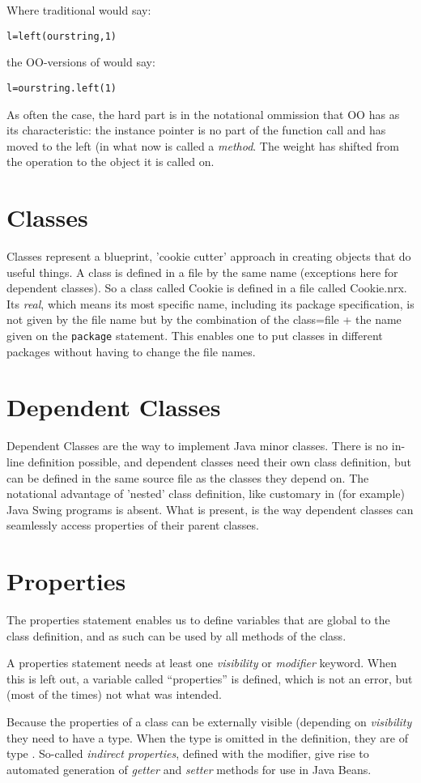 Where traditional \Rexx{} would say:
\begin{alltt}
l=left(ourstring,1)
\end{alltt}
the OO-versions of \Rexx{} would say:
\begin{alltt}
l=ourstring.left(1)
\end{alltt}
As often the case, the hard part is in the notational ommission that
OO has as its characteristic: the instance pointer is no part of the
function call and has moved to the left (in what now is called a
\emph{method}. The weight has shifted from the operation to the object
it is called on.
\section{Classes}
Classes represent a blueprint, 'cookie cutter' approach in creating
objects that do useful things. A class is defined in a file by the
same name (exceptions here for dependent classes). So a class called
Cookie is defined in a file called Cookie.nrx. Its \emph{real}, which
means its most specific name, including its package specification, is
not given by the file name but by the combination of the class=file +
the name given on the \texttt{package} statement. This enables one to
put classes in different packages without having to change the file
names.

\section{Dependent Classes}
Dependent Classes are the \nr{} way to implement Java minor
classes. There is no in-line definition possible, and dependent
classes need their own class definition, but can be defined in the
same source file as the classes they depend on. The notational
advantage of 'nested' class definition, like customary in (for
example) Java Swing programs is absent. What is present, is the way
dependent classes can seamlessly access properties of their parent classes.
\section{Properties}
The properties statement enables us to define variables that are
global to the class definition, and as such can be used by all methods
of the class.
\begin{shaded}\noindent
A properties statement needs at least one \emph{visibility} or
\emph{modifier} keyword. When this is left out, a variable called
``properties'' is defined, which is not an error, but (most of the
times) not what was intended.
\end{shaded}\indent
Because the properties of a class can be externally visible (depending
on \emph{visibility} they need to have a type. When the type is
omitted in the definition, they are of type . So-called
\emph{indirect properties}, defined with the  modifier, give rise to automated generation of
\emph{getter} and \emph{setter} methods for use in Java Beans.
